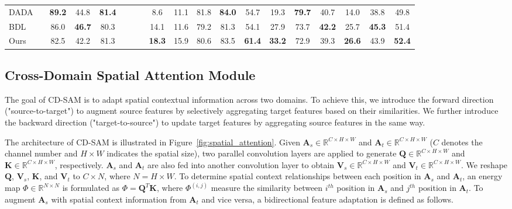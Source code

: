\documentclass[10pt,twocolumn,letterpaper]{article}
\begin{document}
\begin{table*}[t]
\begin{center}
\begin{tabular}{ @{} l|c|*{16}{c}|*{1}{c} @{} }
				DADA \cite{vu2019dada} &  &
				\bf 89.2 & 44.8 & \bf 81.4 & \xmark & \xmark & \xmark & 8.6 & 11.1 & 81.8 & \bf 84.0 & 54.7 & 19.3 & \bf 79.7 & 40.7 & 14.0 & 38.8 & 49.8 \\

				BDL \cite{li2019bidirectional} &  &
				86.0 & \bf 46.7 & 80.3 & \xmark & \xmark & \xmark & 14.1 & 11.6 & 79.2 & 81.3 & 54.1 & 27.9 & 73.7 & \bf 42.2 & 25.7 & \bf 45.3 & 51.4 \\

				Ours &  &
				82.5 & 42.2 & 81.3 & \xmark & \xmark & \xmark & \bf 18.3 & 15.9 & 80.6 & 83.5 &
				\bf 61.4 & \bf 33.2 & 72.9 & 39.3 & \bf 26.6 & 43.9 & \bf 52.4 \\

				\bottomrule
			\end{tabular}
		\end{center}
		\vspace{-0.3in}
	\end{table*}

	\subsection{Cross-Domain Spatial Attention Module}

	The goal of CD-SAM is to adapt spatial contextual information across two domains. To achieve this, we introduce the forward direction ("source-to-target") to augment source features by selectively aggregating target features based on their similarities. We further introduce the backward direction ("target-to-source") to update target features by aggregating source features in the same way.

	The architecture of CD-SAM is illustrated in Figure~\ref{fig:spatial_attention}. Given $ \textbf{A}_{s}\in \mathbb{R}^{C \times H \times W} $ and $ \textbf{A}_{t} \in \mathbb{R}^{C \times H \times W} $ ($ C $ denotes the channel number and $ H \times W $ indicates the spatial size), two parallel convolution layers are applied to generate $ \textbf{Q} \in \mathbb{R}^{C \times H \times W} $ and $ \textbf{K} \in \mathbb{R}^{C \times H \times W} $, respectively. $ \textbf{A}_{s} $ and $ \textbf{A}_{t} $ are also fed into another convolution layer to obtain $ \textbf{V}_s \in \mathbb{R}^{C \times H \times W} $ and $ \textbf{V}_t \in \mathbb{R}^{C \times H \times W} $. We reshape $ \textbf{Q} $, $ \textbf{V}_s $, $ \textbf{K} $, and $ \textbf{V}_t $ to $ C \times N $, where $ N = H \times W $. To determine spatial context relationships between each position in $ \textbf{A}_{s} $ and $ \textbf{A}_{t} $, an energy map $ \Phi \in \mathbb{R}^{ N \times N} $ is formulated as $ \Phi = \textbf{Q}^T \textbf{K} $, where $ \Phi^{(i, j)} $ measure the similarity between $ i^{th} $ position in $ \textbf{A}_{s} $ and $ j^{th} $ position in $ \textbf{A}_{t} $. To augment $ \textbf{A}_{s} $ with spatial context information from $ \textbf{A}_{t} $ and vice versa, a bidirectional feature adaptation is defined as follows.
\end{document}
